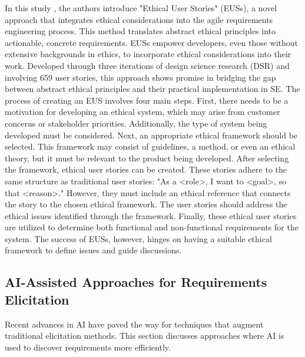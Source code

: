 In this study \cite{halme2024making}, the authors introduce "Ethical User Stories" (EUSs), a novel approach that integrates ethical considerations into the agile requirements engineering process. 
This method translates abstract ethical principles into actionable, concrete requirements. EUSs empower developers, even those without extensive backgrounds in ethics, to incorporate ethical 
considerations into their work. Developed through three iterations of design science research (DSR) and involving 659 user stories, this approach shows promise in bridging the gap between abstract 
ethical principles and their practical implementation in SE.
The process of creating an EUS involves four main steps. First, there needs to be a motivation for developing an ethical system, which may arise from customer concerns or stakeholder priorities. 
Additionally, the type of system being developed must be considered. Next, an appropriate ethical framework should be selected. This framework may consist of guidelines, a method, or even an 
ethical theory, but it must be relevant to the product being developed.
After selecting the framework, ethical user stories can be created. These stories adhere to the same structure as traditional user stories: "As a <role>, I want to <goal>, so that <reason>." 
However, they must include an ethical reference that connects the story to the chosen ethical framework. The user stories should address the ethical issues identified through the framework. 
Finally, these ethical user stories are utilized to determine both functional and non-functional requirements for the system.
The success of EUSs, however, hinges on having a suitable ethical framework to define issues and guide discussions.


\subsection{AI-Assisted Approaches for Requirements Elicitation}
Recent advances in AI have paved the way for techniques that augment traditional elicitation methods. This section discusses approaches where AI is used to discover requirements more efficiently.

